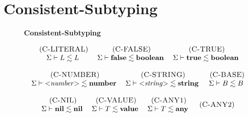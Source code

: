 \section{Consistent-Subtyping}

\begin{figure}[!ht]
\textbf{Consistent-Subtyping}\\
\dstart
\begin{footnotesize}
$$
\begin{array}{c}
\begin{array}{c}
\mylabel{C-LITERAL}\\
\senv \vdash L \lesssim L
\end{array}
\;
\begin{array}{c}
\mylabel{C-FALSE}\\
\senv \vdash \False \lesssim \Boolean
\end{array}
\;
\begin{array}{c}
\mylabel{C-TRUE}\\
\senv \vdash \True \lesssim \Boolean
\end{array}
\\ \\
\begin{array}{c}
\mylabel{C-NUMBER}\\
\senv \vdash {<}{\it number}{>} \lesssim \Number
\end{array}
\;
\begin{array}{c}
\mylabel{C-STRING}\\
\senv \vdash {<}{\it string}{>} \lesssim \String
\end{array}
\;
\begin{array}{c}
\mylabel{C-BASE}\\
\senv \vdash B \lesssim B
\end{array}
\\ \\
\begin{array}{c}
\mylabel{C-NIL}\\
\senv \vdash \Nil \lesssim \Nil
\end{array}
\;
\begin{array}{c}
\mylabel{C-VALUE}\\
\senv \vdash T \lesssim \Value
\end{array}
\;
\begin{array}{c}
\mylabel{C-ANY1}\\
\senv \vdash T \lesssim \Any
\end{array}
\;
\begin{array}{c}
\mylabel{C-ANY2}\\

\end{array}
\end{array}$$
\end{footnotesize}
\end{figure}
